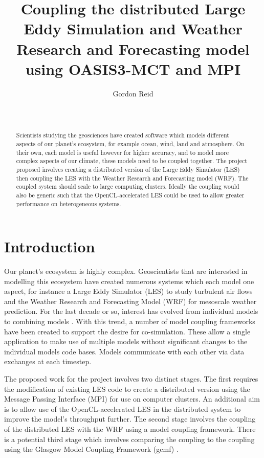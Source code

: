 \documentclass{acm_proc_article-sp}
\title{Coupling the distributed Large Eddy Simulation and Weather Research and
Forecasting model using OASIS3-MCT and MPI}
\author{
    \alignauthor
    Gordon Reid\\
    \affaddr{School of Computing Science}\\
    \affaddr{University of Glasgow}\\
    \email{1002536r@student.gla.ac.uk}
}
\begin{document}
\maketitle

\begin{abstract}

Scientists studying the geosciences have created software which models different
aspects of our planet's ecosystem, for example ocean, wind, land and atmosphere.
On their own, each model is useful however for higher accuracy, and to model
more complex aspects of our climate, these models need to be coupled together.
The project proposed involves creating a distributed version of the Large Eddy
Simulator (LES) then coupling the LES with the Weather Research and Forecasting
model (WRF). The coupled system should scale to large computing clusters.
Ideally the coupling would also be generic such that the OpenCL-accelerated LES
could be used to allow greater performance on heterogeneous systems.

\end{abstract}

\section*{Introduction}

Our planet's ecosystem is highly complex. Geoscientists that are interested in
modelling this ecosystem have created numerous systems which each model one
aspect, for instance a Large Eddy Simulator (LES) to study turbulent air flows
\cite{Nakayama2011,Nakayama2012} and the Weather Research and Forecasting Model
(WRF) for mesoscale weather prediction. For the last decade or so, interest has
evolved from individual models to combining models \cite{Michalakes2010}. With
this trend, a number of model coupling frameworks have been created to support
the desire for co-simulation. These allow a single application to make use of
multiple models without significant changes to the individual models code bases.
Models communicate with each other via data exchanges at each timestep.

The proposed work for the project involves two distinct stages. The first
requires the modification of existing LES code to create a distributed version
using the Message Passing Interface (MPI) for use on computer clusters. An
additional aim is to allow use of the OpenCL-accelerated LES
\cite{Vanderbauwhede2014} in the distributed system to improve the model's
throughput further. The second stage involves the coupling of the distributed
LES with the WRF using a model coupling framework. There is a potential third
stage which involves comparing the coupling to the coupling using the Glasgow
Model Coupling Framework (gcmf) \cite{Vanderbauwhede2014}.
\end{document}
